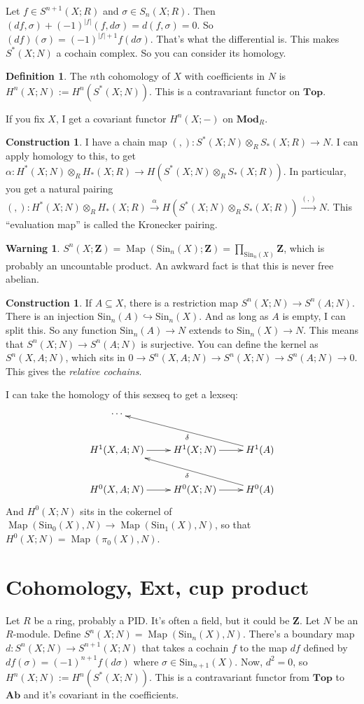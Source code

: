 \documentclass{amsart}
\theoremstyle{theorem}
\theoremstyle{definition}
\newtheorem{definition}[theorem]{Definition}
\newtheorem{construction}[theorem]{Construction}
\newtheorem{warning}[theorem]{Warning}
\DeclareMathOperator{\Map}{Map}
\newcommand{\Z}{\mathbf Z}
\newcommand{\Sin}{\mathrm{Sin}}
\begin{document}
Let $f\in S^{n+1}(X;R)$ and $\sigma\in S_n(X;R)$. Then $(df,\sigma)+(-1)^{|f|}(f,d\sigma)=d(f,\sigma)=0$. So $(df)(\sigma)=(-1)^{|f|+1}f(d\sigma)$. That's what the differential is. This makes $S^\ast(X;N)$ a cochain complex. So you can consider its homology.
\begin{definition}
The $n$th cohomology of $X$ with coefficients in $N$ is $ H^n(X;N):= H^n(S^\ast(X;N))$. This is a contravariant functor on $\mathbf{Top}$.
\end{definition}
If you fix $X$, I get a covariant functor $ H^n(X;-)$ on $\mathbf{Mod}_R$.
\begin{construction}
I have a chain map $(,):S^\ast(X;N)\otimes_R S_\ast(X;R)\to N$. I can apply homology to this, to get $\alpha: H^\ast(X;N)\otimes_R H_\ast(X;R)\to H(S^\ast(X;N)\otimes_R S_\ast(X;R))$. In particular, you get a natural pairing $(,): H^\ast(X;N)\otimes_R H_\ast(X;R)\xrightarrow{\alpha} H(S^\ast(X;N)\otimes_R S_\ast(X;R))\xrightarrow{(,)}N$. This ``evaluation map'' is called the Kronecker pairing.
\end{construction}
\begin{warning}
$S^n(X;\Z)=\Map(\Sin_n(X);\Z)=\prod_{\Sin_n(X)}\Z$, which is probably an uncountable product. An awkward fact is that this is never free abelian.
\end{warning}
\begin{construction}
If $A\subseteq X$, there is a restriction map $S^n(X;N)\to S^n(A;N)$. There is an injection $\Sin_n(A)\hookrightarrow \Sin_n(X)$. And as long as $A$ is empty, I can split this. So any function $\Sin_n(A)\to N$ extends to $\Sin_n(X)\to N$. This means that $S^n(X;N)\to S^n(A;N)$ is surjective. You can define the kernel as $S^n(X,A;N)$, which sits in $0\to S^n(X,A;N)\to S^n(X;N)\to S^n(A;N)\to 0$. This gives the \emph{relative cochains}.
\end{construction}
I can take the homology of this sexseq to get a lexseq:
\begin{equation*}
\xymatrix{
	\cdots & & \\
	 H^1(X,A;N)\ar[r] & H^1(X;N)\ar[r] & H^1(A)\ar[ull]^{\delta}\\
	 H^0(X,A;N)\ar[r] & H^0(X;N)\ar[r] & H^0(A)\ar[ull]^{\delta}
}
\end{equation*}
And $ H^0(X;N)$ sits in the cokernel of $\Map(\Sin_0(X),N)\to \Map(\Sin_1(X),N)$, so that $ H^0(X;N)=\Map(\pi_0(X),N)$.
\section{Cohomology, Ext, cup product}
Let $R$ be a ring, probably a PID. It's often a field, but it could be $\Z$. Let $N$ be an $R$-module. Define $S^n(X;N)=\Map(\Sin_n(X),N)$. There's a boundary map $d:S^n(X;N)\to S^{n+1}(X;N)$ that takes a cochain $f$ to the map $df$ defined by $df(\sigma)=(-1)^{n+1}f(d\sigma)$ where $\sigma\in \Sin_{n+1}(X)$. Now, $d^2=0$, so $ H^n(X;N):= H^n(S^\ast(X;N))$. This is a contravariant functor from $\mathbf{Top}$ to $\mathbf{Ab}$ and it's covariant in the coefficients. 
\end{document}
